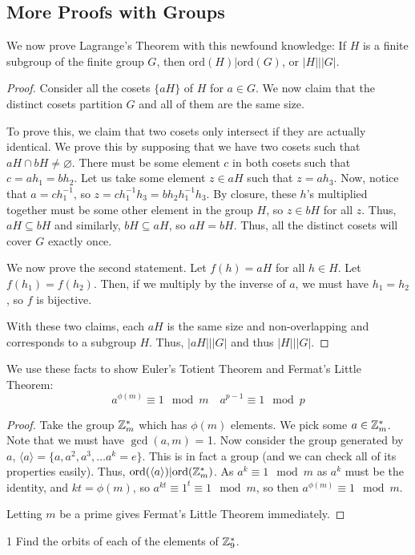 \subsection{More Proofs with Groups}
We now prove Lagrange's Theorem with this newfound knowledge: If $H$ is a finite subgroup of the finite group $G$, then $\mathrm{ord}(H) | \mathrm{ord}(G)$, or $|H| | |G|$. 
\begin{proof}
Consider all the cosets $\{ aH \}$ of $H$ for $a \in G$. We now claim that the distinct cosets partition $G$ and all of them are the same size. 

To prove this, we claim that two cosets only intersect if they are actually identical. We prove this by supposing that we have two cosets such that $aH \cap bH \neq \varnothing$. There must be some element $c$ in both cosets such that $c = ah_1 = bh_2$. Let us take some element $z \in aH$ such that $z = ah_3$. Now, notice that $a = ch_1^{-1}$, so $z = ch_1^{-1}h_3 = bh_2 h_1^{-1} h_3$. By closure, these $h$'s multiplied together must be some other element in the group $H$, so $z \in bH$ for all $z$. Thus, $aH \subseteq bH$ and similarly, $bH \subseteq aH$, so $aH = bH$. Thus, all the distinct cosets will cover $G$ exactly once. 

We now prove the second statement. Let $f(h) = aH$ for all $h \in H$. Let $f(h_1) = f(h_2)$. Then, if we multiply by the inverse of $a$, we must have $h_1 = h_2$, so $f$ is bijective. 

With these two claims, each $aH$ is the same size and non-overlapping and corresponds to a subgroup $H$. Thus, $|aH| | |G|$ and thus $|H| | |G|$. 

\end{proof}

We use these facts to show Euler's Totient Theorem and Fermat's Little Theorem: 
\[
	a^{\phi(m)} \equiv 1 \mod m \quad a^{p-1} \equiv 1 \mod p
\]
\begin{proof}
Take the group $\mathbb{Z}_m^*$ which has $\phi(m)$ elements. We pick some $a \in \mathbb{Z}_m^*$. Note that we must have $\gcd(a, m)$ = 1. Now consider the group generated by $a$, $\langle a \rangle = \{ a, a^2, a^3, \ldots a^k = e\}$. This is in fact a group (and we can check all of its properties easily). Thus, $\mathrm{ord}(\langle a \rangle) | \mathrm{ord}( \mathbb{Z}_m^*)$. As $a^k \equiv 1 \mod m$ as $a^k$ must be the identity, and $kt = \phi(m)$, so $a^{kt} \equiv 1^t \equiv 1 \mod m$, so then $a^{\phi(m)} \equiv 1 \mod m$. 

Letting $m$ be a prime gives Fermat's Little Theorem immediately. 
\end{proof}

\begin{exercise}1
    Find the orbits of each of the elements of $\mathbb{Z}_9^*$. 
\end{exercise}













% 
